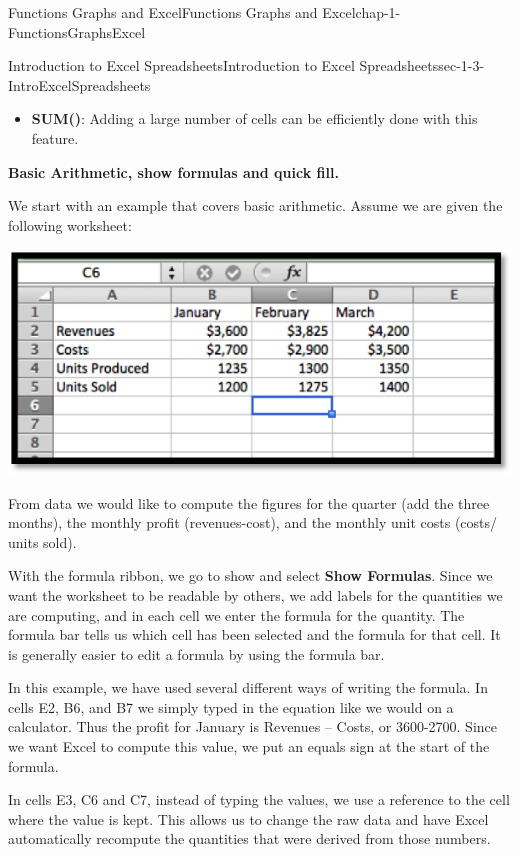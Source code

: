 \documentclass[oneside,10pt,]{book}
\newcommand{\terminology}[1]{\textbf{#1}}
\numberwithin{equation}{section}
\begin{document}
\begin{chapterptx}{Functions Graphs and Excel}{}{Functions Graphs and Excel}{}{}{chap-1-FunctionsGraphsExcel}
\begin{sectionptx}{Introduction to Excel Spreadsheets}{}{Introduction to Excel Spreadsheets}{}{}{sec-1-3-IntroExcelSpreadsheets}
\begin{itemize}[label=\textbullet]
\item{}\hypertarget{p-231}{}%
\terminology{SUM()}: Adding a large number of cells can be efficiently done with this feature.%
\end{itemize}
\hypertarget{p-232}{}%
\terminology{Basic Arithmetic, show formulas and quick fill.}%
\par
\hypertarget{p-233}{}%
We start with an example that covers basic arithmetic.  Assume we are given the following worksheet:%
\begin{sidebyside}{1}{0.25}{0.25}{0}%
\begin{sbspanel}{0.5}%
\includegraphics[width=1\linewidth]{images/sec1-3-1BasicData.png}
\end{sbspanel}%
\end{sidebyside}%
\par
\hypertarget{p-234}{}%
From data we would like to compute the figures for the quarter (add the three months), the monthly profit (revenues-cost), and the monthly unit costs (costs\slash{} units sold).%
\par
\hypertarget{p-235}{}%
With the formula ribbon, we go to show and select \terminology{Show Formulas}.  Since we want the worksheet to be readable by others, we add labels for the quantities we are computing, and in each cell we enter the formula for the quantity.   The formula bar tells us which cell has been selected and the formula for that cell.   It is generally easier to edit a formula by using the formula bar.%
\par
\hypertarget{p-236}{}%
In this example, we have used several different ways of writing the formula.  In cells E2, B6, and B7 we simply typed in the equation like we would on a calculator.  Thus the profit for January is Revenues – Costs, or 3600-2700.  Since we want Excel to compute this value, we put an equals sign at the start of the formula.%
\par
\hypertarget{p-237}{}%
In cells E3, C6 and C7, instead of typing the values, we use a reference to the cell where the value is kept.  This allows us to change the raw data and have Excel automatically recompute the quantities that were derived from those numbers.%

\end{sectionptx}
\end{chapterptx}
\end{document}
